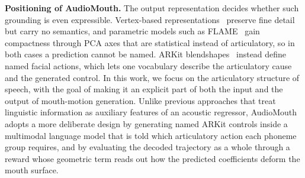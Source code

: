 \noindent\textbf{Positioning of AudioMouth.}\quad
The output representation decides whether such grounding is even expressible. Vertex-based representations~\citep{cudeiro2019voca,fan2022faceformer,aloni2025express4d} preserve fine detail but carry no semantics, and parametric models such as FLAME~\citep{li2017learning} gain compactness through PCA axes that are statistical instead of articulatory, so in both cases a prediction cannot be named. ARKit blendshapes~\citep{apple_arkit} instead define named facial actions, which lets one vocabulary describe the articulatory cause and the generated control. In this work, we focus on the articulatory structure of speech, with the goal of making it an explicit part of both the input and the output of mouth-motion generation. Unlike previous approaches that treat linguistic information as auxiliary features of an acoustic regressor, AudioMouth adopts a more deliberate design by generating named ARKit controls inside a multimodal language model that is told which articulatory action each phoneme group requires, and by evaluating the decoded trajectory as a whole through a reward whose geometric term reads out how the predicted coefficients deform the mouth surface.
